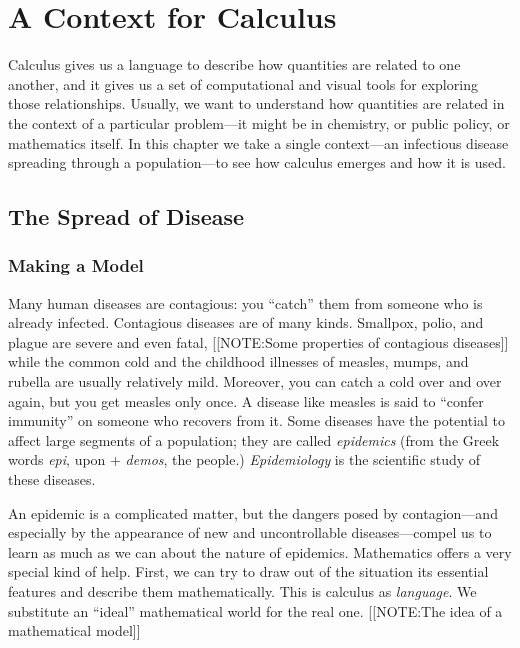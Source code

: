 
\chapter{A Context for Calculus}
\label{chap:a-context-for-calculus}

Calculus gives us a language to describe how quantities are related to
one another, and it gives us a set of computational and visual tools
for exploring those relationships.  Usually, we want to understand how
quantities are related in the context of a particular problem---it
might be in chemistry, or public policy, or mathematics itself.  In
this chapter we take a single context---an infectious disease
spreading through a population---to see how calculus emerges and how
it is used.


\section{The Spread of Disease}
\label{sec:the-spread-of-disease}

\subsection{Making a Model}
\label{subsec:making-a-model}

Many human diseases are contagious: you ``catch'' them from someone
who is already infected.  Contagious diseases are of many kinds.
Smallpox, polio, and plague are severe and even fatal, 
[[NOTE:Some properties of contagious diseases]] 
while the common cold and the childhood illnesses of measles, mumps,
and rubella are usually relatively mild.  Moreover, you can catch a
cold over and over again, but you get measles only once.  A disease
like measles is said to ``confer immunity'' on someone who recovers
from it.  Some diseases have the potential to affect large segments of
a population; they are called {\em epidemics} (from
the Greek words {\em epi}, upon + {\em demos}, the people.) {\em
  Epidemiology\/} is the scientific study of these
diseases.

An epidemic is a complicated matter, but the dangers posed by
contagion---and especially by the appearance of new and uncontrollable
diseases---compel us to learn as much as we can about the nature of
epidemics.  Mathematics offers a very special kind of help.  First, we
can try to draw out of the situation its essential features and
describe them mathematically.  This is calculus as {\em language}.  We
substitute an ``ideal'' mathematical world for the real one.
[[NOTE:The idea of a mathematical model]]

